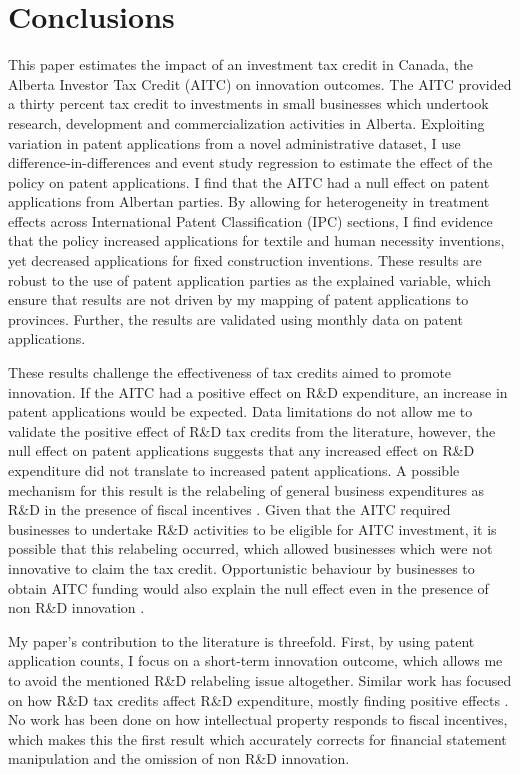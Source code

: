 \documentclass[../main.tex]{subfiles}
\begin{document}
\section{Conclusions}
\label{sec:conclusions}

This paper estimates the impact of an investment tax credit in Canada, the Alberta Investor Tax Credit (AITC) on innovation outcomes. The AITC provided a thirty percent tax credit to investments in small businesses which undertook research, development and commercialization activities in Alberta. Exploiting variation in patent applications from a novel administrative dataset, I use difference-in-differences and event study regression to estimate the effect of the policy on patent applications. I find that the AITC had a null effect on patent applications from Albertan parties. By allowing for heterogeneity in treatment effects across International Patent Classification (IPC) sections, I find evidence that the policy increased applications for textile and human necessity inventions, yet decreased applications for fixed construction inventions. These results are robust to the use of patent application parties as the explained variable, which ensure that results are not driven by my mapping of patent applications to provinces. Further, the results are validated using monthly data on patent applications. 

These results challenge the effectiveness of tax credits aimed to promote innovation. If the AITC had a positive effect on R\&D expenditure, an increase in patent applications would be expected. Data limitations do not allow me to validate the positive effect of R\&D tax credits from the literature, however, the null effect on patent applications suggests that any increased effect on R\&D expenditure did not translate to increased patent applications. A possible mechanism for this result is the relabeling of general business expenditures as R\&D in the presence of fiscal incentives \parencite{chen_etal21}. Given that the AITC required businesses to undertake R\&D activities to be eligible for AITC investment, it is possible that this relabeling occurred, which allowed businesses which were not innovative to claim the tax credit. Opportunistic behaviour by businesses to obtain AITC funding would also explain the null effect even in the presence of non R\&D innovation \parencite{xie_etal19}. 

My paper's contribution to the literature is threefold. First, by using patent application counts, I focus on a short-term innovation outcome, which allows me to avoid the mentioned R\&D relabeling issue altogether. Similar work has focused on how R\&D tax credits affect R\&D expenditure, mostly finding positive effects \parencite{guceri18,rao16,guceri_liu19,becker15}. No work has been done on how intellectual property responds to fiscal incentives, which makes this the first result which accurately corrects for financial statement manipulation and the omission of non R\&D innovation.
\end{document}
